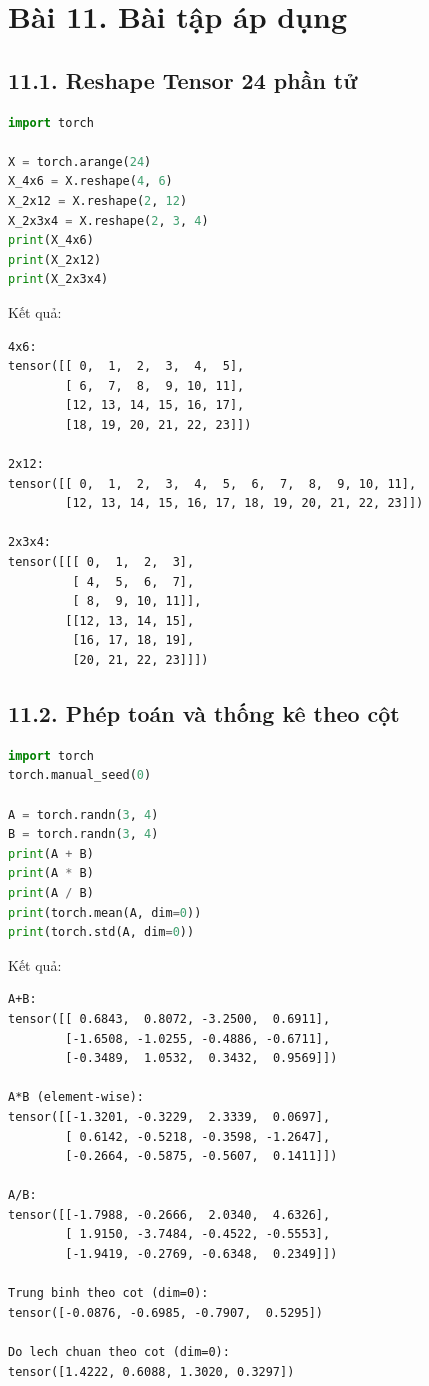 \documentclass[a4paper,13pt]{article}
\begin{document}
\newpage
\section{Bài 11. Bài tập áp dụng}

\subsection{11.1. Reshape Tensor 24 phần tử}
\begin{lstlisting}[language=Python]
import torch

X = torch.arange(24)
X_4x6 = X.reshape(4, 6)
X_2x12 = X.reshape(2, 12)
X_2x3x4 = X.reshape(2, 3, 4)
print(X_4x6)
print(X_2x12)
print(X_2x3x4)
\end{lstlisting}
Kết quả:
\begin{lstlisting}[backgroundcolor=\color{outgray}]
4x6:
tensor([[ 0,  1,  2,  3,  4,  5],
        [ 6,  7,  8,  9, 10, 11],
        [12, 13, 14, 15, 16, 17],
        [18, 19, 20, 21, 22, 23]])

2x12:
tensor([[ 0,  1,  2,  3,  4,  5,  6,  7,  8,  9, 10, 11],
        [12, 13, 14, 15, 16, 17, 18, 19, 20, 21, 22, 23]])

2x3x4:
tensor([[[ 0,  1,  2,  3],
         [ 4,  5,  6,  7],
         [ 8,  9, 10, 11]],
        [[12, 13, 14, 15],
         [16, 17, 18, 19],
         [20, 21, 22, 23]]])
\end{lstlisting}

\subsection{11.2. Phép toán và thống kê theo cột}
\begin{lstlisting}[language=Python]
import torch
torch.manual_seed(0)

A = torch.randn(3, 4)
B = torch.randn(3, 4)
print(A + B)
print(A * B)
print(A / B)
print(torch.mean(A, dim=0))
print(torch.std(A, dim=0))
\end{lstlisting}
Kết quả:
\begin{lstlisting}[backgroundcolor=\color{outgray}]
A+B:
tensor([[ 0.6843,  0.8072, -3.2500,  0.6911],
        [-1.6508, -1.0255, -0.4886, -0.6711],
        [-0.3489,  1.0532,  0.3432,  0.9569]])

A*B (element-wise):
tensor([[-1.3201, -0.3229,  2.3339,  0.0697],
        [ 0.6142, -0.5218, -0.3598, -1.2647],
        [-0.2664, -0.5875, -0.5607,  0.1411]])

A/B:
tensor([[-1.7988, -0.2666,  2.0340,  4.6326],
        [ 1.9150, -3.7484, -0.4522, -0.5553],
        [-1.9419, -0.2769, -0.6348,  0.2349]])

Trung binh theo cot (dim=0):
tensor([-0.0876, -0.6985, -0.7907,  0.5295])

Do lech chuan theo cot (dim=0):
tensor([1.4222, 0.6088, 1.3020, 0.3297])
\end{lstlisting}
\end{document}

